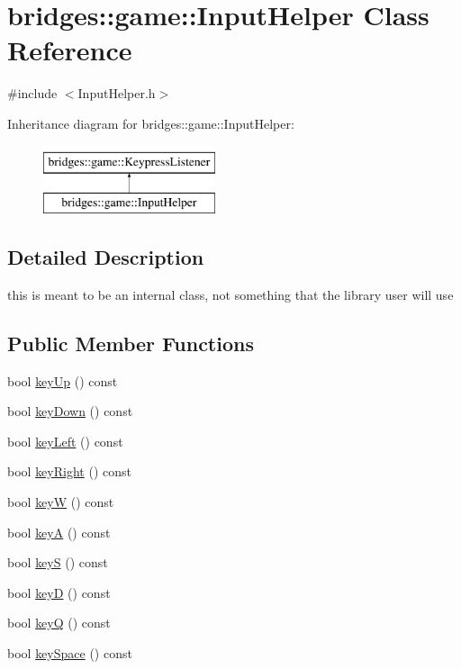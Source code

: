 \hypertarget{classbridges_1_1game_1_1_input_helper}{}\section{bridges\+:\+:game\+:\+:Input\+Helper Class Reference}
\label{classbridges_1_1game_1_1_input_helper}


{\ttfamily \#include $<$Input\+Helper.\+h$>$}

Inheritance diagram for bridges\+:\+:game\+:\+:Input\+Helper\+:\begin{figure}[H]
\begin{center}
\leavevmode
\includegraphics[height=2.000000cm]{classbridges_1_1game_1_1_input_helper}
\end{center}
\end{figure}


\subsection{Detailed Description}
this is meant to be an internal class, not something that the library user will use \subsection*{Public Member Functions}
\begin{DoxyCompactItemize}
\item 
bool \hyperlink{classbridges_1_1game_1_1_input_helper_aaa62faebd9e874228b710bb2a57cba2b}{key\+Up} () const
\item 
bool \hyperlink{classbridges_1_1game_1_1_input_helper_a904f5f5d2c6408bcd447044555cd376d}{key\+Down} () const
\item 
bool \hyperlink{classbridges_1_1game_1_1_input_helper_a9e98e137e69ef8b2f92e587092c42af4}{key\+Left} () const
\item 
bool \hyperlink{classbridges_1_1game_1_1_input_helper_a265fb9bd88d66e5439dd791bb90c79a4}{key\+Right} () const
\item 
bool \hyperlink{classbridges_1_1game_1_1_input_helper_a97a204c00019b28b4e95dde0b757a1aa}{keyW} () const
\item 
bool \hyperlink{classbridges_1_1game_1_1_input_helper_a168770e762b33e32597f9f7294082d9b}{keyA} () const
\item 
bool \hyperlink{classbridges_1_1game_1_1_input_helper_aa141b96b3406e66feab876185c7f350e}{keyS} () const
\item 
bool \hyperlink{classbridges_1_1game_1_1_input_helper_af7247d84254d706e3a309db2f4c20e9b}{keyD} () const
\item 
bool \hyperlink{classbridges_1_1game_1_1_input_helper_acef5fda1a5679e811fdf5a669dc65f9f}{keyQ} () const
\item 
bool \hyperlink{classbridges_1_1game_1_1_input_helper_a1750cd9c59e18126c251ec468fc87d48}{key\+Space} () const
\end{DoxyCompactItemize}

